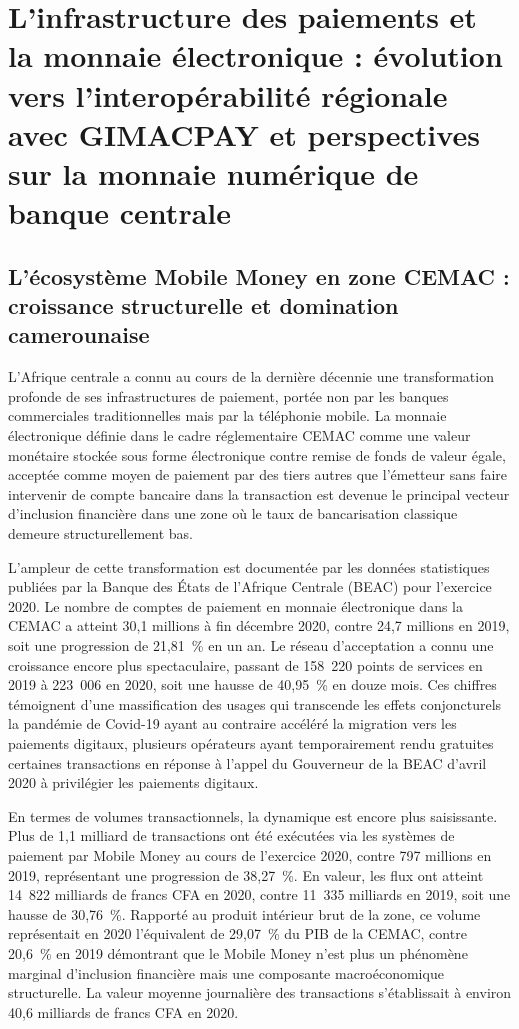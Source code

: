 \documentclass[11pt,a4paper,oneside]{report}
\theoremstyle{definition}
\theoremstyle{remark}
\begin{document}
\section{L'infrastructure des paiements et la monnaie électronique : évolution vers l'interopérabilité régionale avec GIMACPAY et perspectives sur la monnaie numérique de banque centrale}

\subsection{L'écosystème Mobile Money en zone CEMAC : croissance structurelle et domination camerounaise}

L'Afrique centrale a connu au cours de la dernière décennie une transformation profonde de ses infrastructures de paiement, portée non par les banques commerciales traditionnelles mais par la téléphonie mobile. La monnaie électronique  définie dans le cadre réglementaire CEMAC comme une valeur monétaire stockée sous forme électronique contre remise de fonds de valeur égale, acceptée comme moyen de paiement par des tiers autres que l'émetteur sans faire intervenir de compte bancaire dans la transaction  est devenue le principal vecteur d'inclusion financière dans une zone où le taux de bancarisation classique demeure structurellement bas.

L'ampleur de cette transformation est documentée par les données statistiques publiées par la Banque des États de l'Afrique Centrale (BEAC) pour l'exercice 2020. Le nombre de comptes de paiement en monnaie électronique dans la CEMAC a atteint 30,1 millions à fin décembre 2020, contre 24,7 millions en 2019, soit une progression de 21,81~\% en un an. Le réseau d'acceptation a connu une croissance encore plus spectaculaire, passant de 158~220 points de services en 2019 à 223~006 en 2020, soit une hausse de 40,95~\% en douze mois. Ces chiffres témoignent d'une massification des usages qui transcende les effets conjoncturels  la pandémie de Covid-19 ayant au contraire accéléré la migration vers les paiements digitaux, plusieurs opérateurs ayant temporairement rendu gratuites certaines transactions en réponse à l'appel du Gouverneur de la BEAC d'avril 2020 à privilégier les paiements digitaux.

En termes de volumes transactionnels, la dynamique est encore plus saisissante. Plus de 1,1 milliard de transactions ont été exécutées via les systèmes de paiement par Mobile Money au cours de l'exercice 2020, contre 797 millions en 2019, représentant une progression de 38,27~\%. En valeur, les flux ont atteint 14~822 milliards de francs CFA en 2020, contre 11~335 milliards en 2019, soit une hausse de 30,76~\%. Rapporté au produit intérieur brut de la zone, ce volume représentait en 2020 l'équivalent de 29,07~\% du PIB de la CEMAC, contre 20,6~\% en 2019  démontrant que le Mobile Money n'est plus un phénomène marginal d'inclusion financière mais une composante macroéconomique structurelle. La valeur moyenne journalière des transactions s'établissait à environ 40,6 milliards de francs CFA en 2020.
\end{document}
